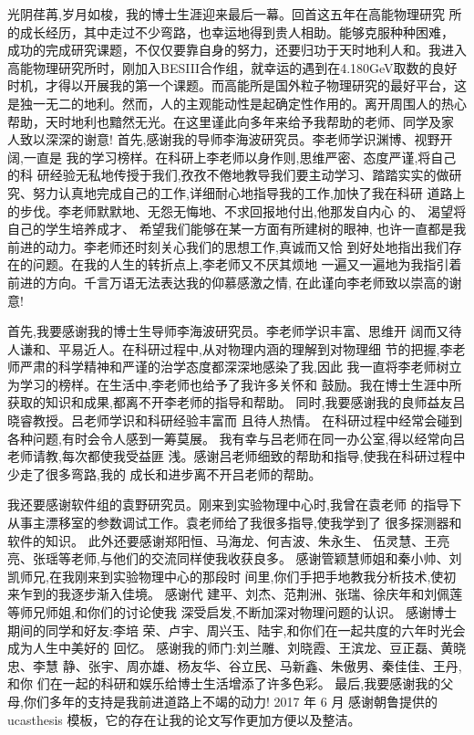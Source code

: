 \begin{acknowledgements}
光阴荏苒,岁月如梭，我的博士生涯迎来最后一幕。回首这五年在高能物理研究
所的成长经历，其中走过不少弯路，也幸运地得到贵人相助。能够克服种种困难，
成功的完成研究课题，不仅仅要靠自身的努力，还要归功于天时地利人和。我进入
高能物理研究所时，刚加入BESIII合作组，就幸运的遇到在4.180GeV取数的良好
时机，才得以开展我的第一个课题。而高能所是国外粒子物理研究的最好平台，这
是独一无二的地利。然而，人的主观能动性是起确定性作用的。离开周围人的热心
帮助，天时地利也黯然无光。在这里谨此向多年来给予我帮助的老师、同学及家
人致以深深的谢意!
首先,感谢我的导师李海波研究员。李老师学识渊博、视野开阔,一直是
我的学习榜样。在科研上李老师以身作则,思维严密、态度严谨,将自己的科
研经验无私地传授于我们,孜孜不倦地教导我们要主动学习、踏踏实实的做研
究、努力认真地完成自己的工作,详细耐心地指导我的工作,加快了我在科研
道路上的步伐。李老师默默地、无怨无悔地、不求回报地付出,他那发自内心
的、 渴望将自己的学生培养成才、 希望我们能够在某一方面有所建树的眼神,
也许一直都是我前进的动力。李老师还时刻关心我们的思想工作,真诚而又恰
到好处地指出我们存在的问题。在我的人生的转折点上,李老师又不厌其烦地
一遍又一遍地为我指引着前进的方向。千言万语无法表达我的仰慕感激之情,
在此谨向李老师致以崇高的谢意!

首先,我要感谢我的博士生导师李海波研究员。李老师学识丰富、思维开
阔而又待人谦和、平易近人。在科研过程中,从对物理内涵的理解到对物理细
节的把握,李老师严肃的科学精神和严谨的治学态度都深深地感染了我,因此
我一直将李老师树立为学习的榜样。在生活中,李老师也给予了我许多关怀和
鼓励。我在博士生涯中所获取的知识和成果,都离不开李老师的指导和帮助。
同时,我要感谢我的良师益友吕晓睿教授。吕老师学识和科研经验丰富而
且待人热情。 在科研过程中经常会碰到各种问题,有时会令人感到一筹莫展。
我有幸与吕老师在同一办公室,得以经常向吕老师请教,每次都使我受益匪
浅。感谢吕老师细致的帮助和指导,使我在科研过程中少走了很多弯路,我的
成长和进步离不开吕老师的帮助。


我还要感谢软件组的袁野研究员。刚来到实验物理中心时,我曾在袁老师
的指导下从事主漂移室的参数调试工作。袁老师给了我很多指导,使我学到了
很多探测器和软件的知识。 此外还要感谢郑阳恒、马海龙、何吉波、朱永生、
伍灵慧、王亮亮、张瑶等老师,与他们的交流同样使我收获良多。
感谢管颖慧师姐和秦小帅、刘凯师兄,在我刚来到实验物理中心的那段时
间里,你们手把手地教我分析技术,使初来乍到的我逐步渐入佳境。 感谢代
建平、刘杰、范荆洲、张瑞、徐庆年和刘佩莲等师兄师姐,和你们的讨论使我
深受启发,不断加深对物理问题的认识。 感谢博士期间的同学和好友:李培
荣、卢宇、周兴玉、陆宇,和你们在一起共度的六年时光会成为人生中美好的
回忆。
感谢我的师门:刘兰雕、刘晓霞、王滨龙、豆正磊、黄晓忠、李慧
静、张宇、周亦雄、杨友华、谷立民、马新鑫、朱傲男、秦佳佳、王丹,和你
们在一起的科研和娱乐给博士生活增添了许多色彩。
最后,我要感谢我的父母,你们多年的支持是我前进道路上不竭的动力!
2017 年 6 月
感谢朝鲁提供的 ucasthesis 模板，它的存在让我的论文写作更加方便以及整洁。

\end{acknowledgements}
